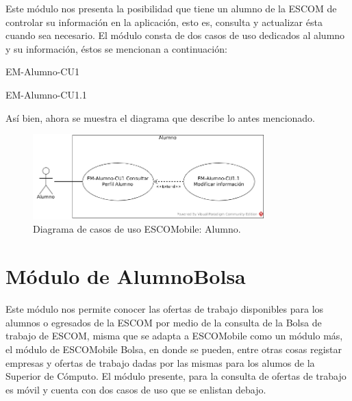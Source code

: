 \noindent
Este módulo nos presenta la posibilidad que tiene un alumno de la ESCOM de controlar su información
en la aplicación, esto es, consulta y actualizar ésta cuando sea necesario. El módulo consta de dos 
casos de uso dedicados al alumno y su información, éstos se mencionan a continuación:

\begin{requisitos}{EM-Alumno-CU1}
\end{requisitos}

\begin{requisitos}{EM-Alumno-CU1.1}
\end{requisitos}

\noindent
Así bien, ahora se muestra el diagrama que describe lo antes mencionado. 

\pagebreak
\begin{figure}[htbp!]
	\centering
	\includegraphics[width=0.8\textwidth]{images/casos/alumno}
	\caption{Diagrama de casos de uso ESCOMobile: Alumno.}
\end{figure}




\section{Módulo de AlumnoBolsa}

\noindent
Este módulo nos permite conocer las ofertas de trabajo disponibles para los alumnos o egresados de la ESCOM
por medio de la consulta de la Bolsa de trabajo de ESCOM, misma que se adapta a ESCOMobile como un módulo más, 
el módulo de ESCOMobile Bolsa, en donde se pueden, entre otras cosas registar empresas y ofertas de trabajo
dadas por las mismas para los alumos de la Superior de Cómputo. 
El módulo presente, para la consulta de ofertas de trabajo es móvil y cuenta con dos casos de uso que se
enlistan debajo.

